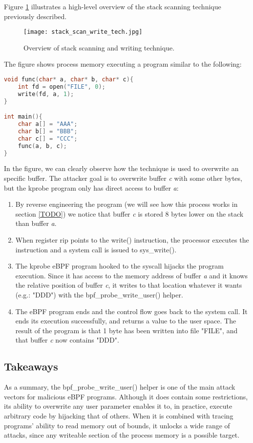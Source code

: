 Figure \ref{fig:stack_scan_write_tech} illustrates a high-level overview of the stack scanning technique previously described.
\begin{figure}[H]
	\centering
	\texttt{[image: stack\_scan\_write\_tech.jpg]}
	\caption{Overview of stack scanning and writing technique.}
	\label{fig:stack_scan_write_tech}
\end{figure}

The figure shows process memory executing a program similar to the following:
\begin{lstlisting}[language=C, caption={Sample program being executed on figure \ref{fig:stack_scan_write_tech}.}, label={code:stack_scan_write_tech}]
void func(char* a, char* b, char* c){
	int fd = open("FILE", 0);
	write(fd, a, 1);
}

int main(){
	char a[] = "AAA";
	char b[] = "BBB";
	char c[] = "CCC";
	func(a, b, c);
}
\end{lstlisting}

In the figure, we can clearly observe how the technique is used to overwrite an specific buffer. The attacker goal is to overwrite buffer \textit{c} with some other bytes, but the kprobe program only has direct access to buffer \textit{a}:
\begin{enumerate}
\item By reverse engineering the program (we will see how this process works in section \ref{TODO}) we notice that buffer \textit{c} is stored 8 bytes lower on the stack than buffer \textit{a}.
\item When register rip points to the write() instruction, the processor executes the instruction and a system call is issued to sys\_write().
\item The kprobe eBPF program hooked to the syscall hijacks the program execution. Since it has access to the memory address of buffer \textit{a} and it knows the relative position of buffer \textit{c}, it writes to that location whatever it wants (e.g.: "DDD") with the bpf\_probe\_write\_user() helper.
\item The eBPF program ends and the control flow goes back to the system call. It ends its execution successfully, and returns a value to the user space. The result of the program is that 1 byte has been written into file "FILE", and that buffer \textit{c} now contains "DDD".
\end{enumerate}

\subsection{Takeaways}
As a summary, the bpf\_probe\_write\_user() helper is one of the main attack vectors for malicious eBPF programs. Although it does contain some restrictions, its ability to overwrite any user parameter enables it to, in practice, execute arbitrary code by hijacking that of others. When it is combined with tracing programs' ability to read memory out of bounds, it unlocks a wide range of attacks, since any writeable section of the process memory is a possible target. 

